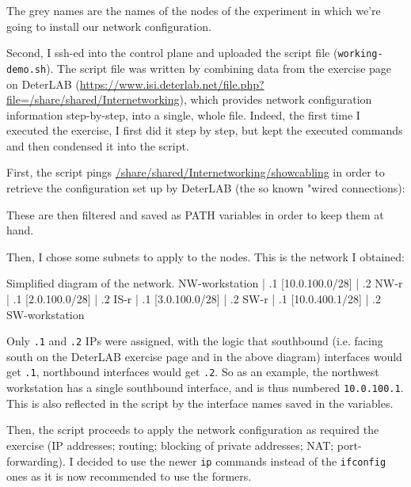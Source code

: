 \documentclass[a4paper,11pt,hidelinks]{article}
\begin{document}
The grey names are the names of the nodes of the experiment in which we're going to install our network configuration.

Second, I ssh-ed into the control plane and uploaded the script file (\verb=working-demo.sh=). The script file was written by combining data from the exercise page on DeterLAB (\url{https://www.isi.deterlab.net/file.php?file=/share/shared/Internetworking}), which provides network configuration information step-by-step, into a single, whole file. Indeed, the first time I executed the exercise, I first did it step by step, but kept the executed commands and then condensed it into the script.

First, the script pings \url{/share/shared/Internetworking/showcabling} in order to retrieve the configuration set up by DeterLAB (the so known "wired connections):


These are then filtered and saved as PATH variables in order to keep them at hand.

Then, I chose some subnets to apply to the nodes. This is the network I obtained:

\begin{code}{Simplified diagram of the network.}
 NW-workstation
       | .1
[10.0.100.0/28]
       | .2
      NW-r
       | .1
[2.0.100.0/28]
       | .2
      IS-r
       | .1
[3.0.100.0/28]
       | .2
      SW-r
       | .1
[10.0.400.1/28]
       | .2
 SW-workstation
\end{code}

Only \verb=.1= and \verb=.2= IPs were assigned, with the logic that southbound (i.e. facing south on the DeterLAB exercise page and in the above diagram) interfaces would get \verb=.1=, northbound interfaces would get \verb=.2=. So as an example, the northwest workstation has a single southbound interface, and is thus numbered \verb=10.0.100.1=. This is also reflected in the script by the interface names saved in the variables.

Then, the script proceeds to apply the network configuration as required the exercise (IP addresses; routing; blocking of private addresses; NAT; port-forwarding). I decided to use the newer \verb=ip= commands instead of the \verb=ifconfig= ones as it is now recommended to use the formers.
\end{document}
